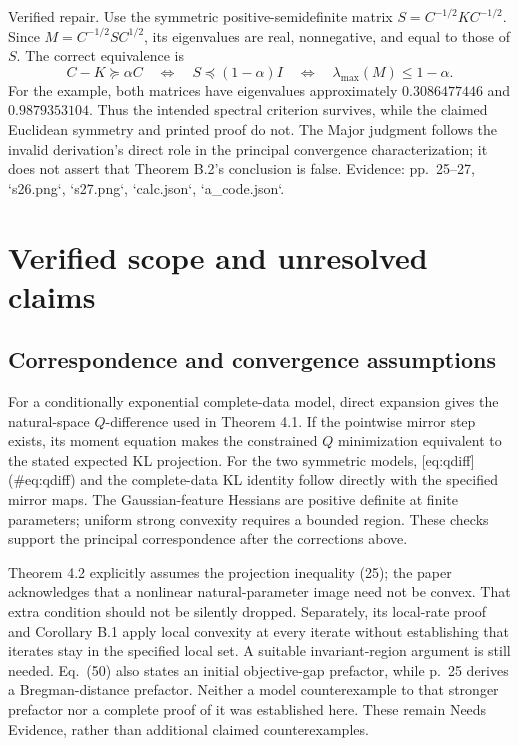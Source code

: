 \documentclass[10pt]{article}
\begin{document}
Verified repair. Use the symmetric positive-semidefinite matrix \(S=C^{-1/2}KC^{-1/2}\). Since \(M=C^{-1/2}SC^{1/2}\), its eigenvalues are real, nonnegative, and equal to those of \(S\). The correct equivalence is \[C-K\succeq\alpha C
 \quad\Longleftrightarrow\quad
 S\preceq(1-\alpha)I
 \quad\Longleftrightarrow\quad
 \lambda_{\max}(M)\le1-\alpha .\] For the example, both matrices have eigenvalues approximately \(0.3086477446\) and \(0.9879353104\). Thus the intended spectral criterion survives, while the claimed Euclidean symmetry and printed proof do not. The Major judgment follows the invalid derivation’s direct role in the principal convergence characterization; it does not assert that Theorem B.2’s conclusion is false. Evidence: pp. 25–27, `s26.png`, `s27.png`, `calc.json`, `a\_code.json`.\par
\section*{Verified scope and unresolved claims}
\subsection*{Correspondence and convergence assumptions}
For a conditionally exponential complete-data model, direct expansion gives the natural-space \(Q\)-difference used in Theorem 4.1. If the pointwise mirror step exists, its moment equation makes the constrained \(Q\) minimization equivalent to the stated expected KL projection. For the two symmetric models, [eq:qdiff] (\#eq:qdiff) and the complete-data KL identity follow directly with the specified mirror maps. The Gaussian-feature Hessians are positive definite at finite parameters; uniform strong convexity requires a bounded region. These checks support the principal correspondence after the corrections above.\par
Theorem 4.2 explicitly assumes the projection inequality (25); the paper acknowledges that a nonlinear natural-parameter image need not be convex. That extra condition should not be silently dropped. Separately, its local-rate proof and Corollary B.1 apply local convexity at every iterate without establishing that iterates stay in the specified local set. A suitable invariant-region argument is still needed. Eq. (50) also states an initial objective-gap prefactor, while p. 25 derives a Bregman-distance prefactor. Neither a model counterexample to that stronger prefactor nor a complete proof of it was established here. These remain Needs Evidence, rather than additional claimed counterexamples.\par
\end{document}
